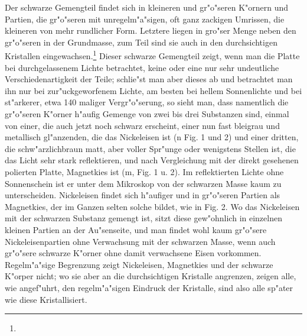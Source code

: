 \documentclass[a4paper, 11pt, oneside]{article}
\begin{document}
Der schwarze Gemengteil findet sich in kleineren und gr"o"seren K"ornern und Partien, die gr"o"seren mit unregelm"a"sigen, oft ganz zackigen Umrissen, die kleineren von mehr rundlicher Form. Letztere liegen in gro"ser Menge neben den gr"o"seren in der Grundmasse, zum Teil sind sie auch in den durchsichtigen Kristallen eingewachsen.\footnote{} Dieser schwarze Gemengteil zeigt, wenn man die Platte bei durchgelassenem Lichte betrachtet, keine oder eine nur sehr undeutliche Verschiedenartigkeit der Teile; schlie"st man aber dieses ab und betrachtet man ihn nur bei zur"uckgeworfenem Lichte, am besten bei hellem Sonnenlichte und bei st"arkerer, etwa 140 maliger Vergr"o"serung, so sieht man, dass namentlich die gr"o"seren K"orner h"aufig Gemenge von zwei bis drei Substanzen sind, einmal von einer, die auch jetzt noch schwarz erscheint, einer nun fast bleigrau und metallisch gl"anzenden, die das Nickeleisen ist (n Fig. 1 und 2) und einer dritten, die schw"arzlichbraun matt, aber voller Spr"unge oder wenigstens Stellen ist, die das Licht sehr stark reflektieren, und nach Vergleichung mit der direkt gesehenen polierten Platte, Magnetkies ist (m, Fig. 1 u. 2). Im reflektierten Lichte ohne Sonnenschein ist er unter dem Mikroskop von der schwarzen Masse kaum zu unterscheiden. Nickeleisen findet sich h"aufiger und in gr"o"seren Partien als Magnetkies, der im Ganzen selten solche bildet, wie in Fig. 2. Wo das Nickeleisen mit der schwarzen Substanz gemengt ist, sitzt diese gew"ohnlich in einzelnen kleinen Partien an der Au"senseite, und man findet wohl kaum gr"o"sere Nickeleisenpartien ohne Verwachsung mit der schwarzen Masse, wenn auch gr"o"sere schwarze K"orner ohne damit verwachsene Eisen vorkommen. Regelm"a"sige Begrenzung zeigt Nickeleisen, Magnetkies und der schwarze K"orper nicht; wo sie aber an die durchsichtigen Kristalle angrenzen, zeigen alle, wie angef"uhrt, den regelm"a"sigen Eindruck der Kristalle, sind also alle sp"ater wie diese Kristallisiert.
\end{document}
